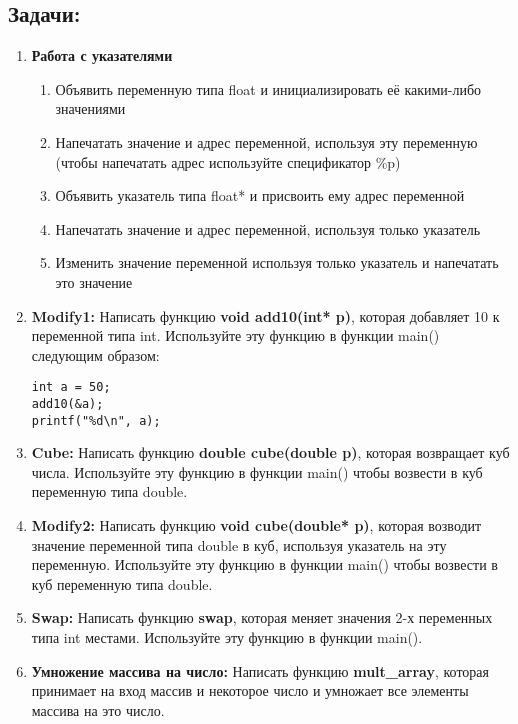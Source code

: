 \documentclass{article}
\begin{document}
\subsection*{Задачи:}
\begin{enumerate}
\item \textbf{Работа с указателями}
	\begin{enumerate}
	\item Объявить переменную типа float и инициализировать её какими-либо значениями
	\item Напечатать значение и адрес переменной, используя эту переменную (чтобы напечатать адрес используйте спецификатор \%p)
	\item Объявить указатель типа float* и присвоить ему адрес переменной
	\item Напечатать значение и адрес переменной, используя только указатель
	\item Изменить значение переменной используя только указатель и напечатать это значение
	\end{enumerate}

\item \textbf{Modify1:} Написать функцию \textbf{void add10(int* p)}, которая добавляет 10 к переменной типа int. Используйте эту функцию в функции main() следующим образом:
\begin{verbatim}
int a = 50;
add10(&a);
printf("%d\n", a);
\end{verbatim}
\item \textbf{Cube:} Написать функцию \textbf{double cube(double p)}, которая возвращает куб числа. Используйте эту функцию в функции main() чтобы возвести в куб переменную типа double.
\item \textbf{Modify2:} Написать функцию \textbf{void cube(double* p)}, которая возводит значение переменной типа double в куб, используя указатель на эту переменную. Используйте эту функцию в функции main() чтобы возвести в куб переменную типа double.
\item \textbf{Swap:} Написать функцию \textbf{swap}, которая меняет значения 2-х переменных типа int местами. Используйте эту функцию в функции main().
\item \textbf{Умножение массива на число:} Написать функцию \textbf{mult\_array}, которая принимает на вход массив и некоторое число и умножает все элементы массива на это число.
\end{enumerate}

\newpage
\end{document}
